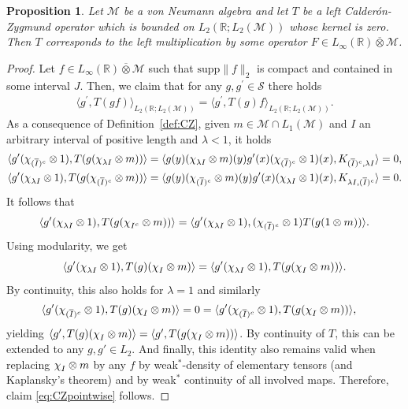 \documentclass[psamsfonts]{amsart}
\newtheorem{proposition}[theorem]{Proposition}
\newcommand*{\bigchi}{\mbox{\large$\chi$}}
\newcommand{\Lone}{L_1}
\newcommand{\Linfty}{L_\infty}
\newcommand{\Ltwo}{L_2}
\newcommand{\Avnat}{\Linfty(\mathbb{R}) \overline{\otimes} \mathcal{M}}
\begin{document}
    \begin{proposition}
        Let $\mathcal{M}$ be a von Neumann algebra and let $T$ be a left Calder\'on-Zygmund operator which is bounded on $\Ltwo(\mathbb{R};\Ltwo(\mathcal{M}))$ whose kernel is zero. Then $T$ corresponds to the  left multiplication by some operator $F \in \Avnat$.
    \end{proposition}
    \begin{proof}
        Let $f \in \Avnat$ such that $\mbox{supp}\|f\|_2$ is compact and contained in some interval $J$. Then, we claim  that for any $g,g^\prime \in \mathcal S$ there holds
        \begin{align}\label{eq:CZpointwise}
            \langle g^\prime, T(gf) \rangle_{\Ltwo(\mathbb{R};\Ltwo(\mathcal{M}))} = \langle g^\prime, T(g) f \rangle_{\Ltwo(\mathbb{R};\Ltwo(\mathcal{M}))}.
        \end{align}
        As a consequence of Definition~\ref{def:CZ}, given $m \in \mathcal{M} \cap \Lone(\mathcal{M})$ and $I$ an arbitrary interval of positive length and $\lambda<1$, it holds
        \begin{align*}
            \langle g^\prime (\bigchi_{(\overline{I})^c} \otimes 1), T(g (\bigchi_{\lambda I} \otimes m)) \rangle &= \langle g(y) (\bigchi_{\lambda I} \otimes m)(y) g^\prime(x) (\bigchi_{(\overline{I})^c} \otimes 1)(x), K_{(\overline{I})^c,\lambda I} \rangle = 0, \\
            \langle g^\prime (\bigchi_{\lambda I} \otimes 1), T(g (\bigchi_{(\overline{I})^c} \otimes m)) \rangle &= \langle g(y) (\bigchi_{(\overline{I})^c} \otimes m)(y) g^\prime(x) (\bigchi_{\lambda I} \otimes 1)(x), K_{\lambda I,(\overline{I})^c} \rangle = 0.
        \end{align*}
        It follows that
        $$
        \langle g^\prime (\bigchi_{\lambda I} \otimes 1), T(g (\bigchi_{I^c} \otimes m)) \rangle =  \langle g^\prime (\bigchi_{\lambda I} \otimes 1), (\bigchi_{(\overline{I})^c} \otimes 1)T(g (1 \otimes m)) \rangle.$$
        Using modularity, we get
        $$ \langle g^\prime (\bigchi_{\lambda I} \otimes 1), T(g) (\bigchi_{I} \otimes m) \rangle = \langle g^\prime (\bigchi_{\lambda I} \otimes 1), T(g (\bigchi_{I} \otimes m)) \rangle.$$
        By continuity, this also holds for $\lambda=1$ and similarly
        \begin{align*}
            \langle g^\prime (\bigchi_{(\overline{I})^c} \otimes 1), T(g) (\bigchi_{I} \otimes m) \rangle &= 0 = \langle g^\prime (\bigchi_{(\overline{I})^c} \otimes 1), T(g (\bigchi_{I} \otimes m)) \rangle,
        \end{align*}
        yielding
        $\langle g^\prime, T(g)(\bigchi_{I} \otimes m) \rangle =
        \langle g^\prime, T(g(\bigchi_{I} \otimes m))
        \rangle$. By continuity of $T$, this can be extended to any $g,g'\in \Ltwo$. And finally, this identity also remains valid when replacing
        $\bigchi_{I} \otimes m$ by any $f$ by weak$^*$-density of elementary tensors (and Kaplansky's theorem) and by weak$^*$ continuity of all involved maps. Therefore, claim \eqref{eq:CZpointwise} follows.
           

\end{proof}
\end{document}
